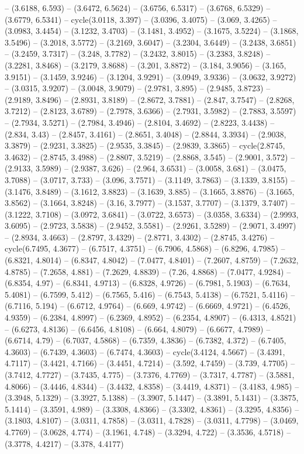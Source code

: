 -- (3.6188, 6.593) -- (3.6472, 6.5624) -- (3.6756, 6.5317) -- (3.6768, 6.5329) -- (3.6779, 6.5341) -- cycle(3.0118, 3.397) -- (3.0396, 3.4075) -- (3.069, 3.4265) -- (3.0983, 3.4454) -- (3.1232, 3.4703) -- (3.1481, 3.4952) -- (3.1675, 3.5224) -- (3.1868, 3.5496) -- (3.2018, 3.5772) -- (3.2169, 3.6047) -- (3.2304, 3.6449) -- (3.2438, 3.6851) -- (3.2459, 3.7317) -- (3.248, 3.7782) -- (3.2432, 3.8015) -- (3.2383, 3.8248) -- (3.2281, 3.8468) -- (3.2179, 3.8688) -- (3.201, 3.8872) -- (3.184, 3.9056) -- (3.165, 3.9151) -- (3.1459, 3.9246) -- (3.1204, 3.9291) -- (3.0949, 3.9336) -- (3.0632, 3.9272) -- (3.0315, 3.9207) -- (3.0048, 3.9079) -- (2.9781, 3.895) -- (2.9485, 3.8723) -- (2.9189, 3.8496) -- (2.8931, 3.8189) -- (2.8672, 3.7881) -- (2.847, 3.7547) -- (2.8268, 3.7212) -- (2.8123, 3.6789) -- (2.7978, 3.6366) -- (2.7931, 3.5982) -- (2.7883, 3.5597) -- (2.7934, 3.5271) -- (2.7984, 3.4946) -- (2.8104, 3.4692) -- (2.8223, 3.4438) -- (2.834, 3.43) -- (2.8457, 3.4161) -- (2.8651, 3.4048) -- (2.8844, 3.3934) -- (2.9038, 3.3879) -- (2.9231, 3.3825) -- (2.9535, 3.3845) -- (2.9839, 3.3865) -- cycle(2.8745, 3.4632) -- (2.8745, 3.4988) -- (2.8807, 3.5219) -- (2.8868, 3.545) -- (2.9001, 3.572) -- (2.9133, 3.5989) -- (2.9387, 3.626) -- (2.964, 3.6531) -- (3.0058, 3.681) -- (3.0475, 3.7088) -- (3.0717, 3.733) -- (3.096, 3.7571) -- (3.1149, 3.7863) -- (3.1339, 3.8155) -- (3.1476, 3.8489) -- (3.1612, 3.8823) -- (3.1639, 3.885) -- (3.1665, 3.8876) -- (3.1665, 3.8562) -- (3.1664, 3.8248) -- (3.16, 3.7977) -- (3.1537, 3.7707) -- (3.1379, 3.7407) -- (3.1222, 3.7108) -- (3.0972, 3.6841) -- (3.0722, 3.6573) -- (3.0358, 3.6334) -- (2.9993, 3.6095) -- (2.9723, 3.5838) -- (2.9452, 3.5581) -- (2.9261, 3.5289) -- (2.9071, 3.4997) -- (2.8934, 3.4663) -- (2.8797, 3.4329) -- (2.8771, 3.4302) -- (2.8745, 3.4276) -- cycle(6.7495, 4.3677) -- (6.7517, 4.3751) -- (6.7906, 4.5868) -- (6.8296, 4.7985) -- (6.8321, 4.8014) -- (6.8347, 4.8042) -- (7.0477, 4.8401) -- (7.2607, 4.8759) -- (7.2632, 4.8785) -- (7.2658, 4.881) -- (7.2629, 4.8839) -- (7.26, 4.8868) -- (7.0477, 4.9284) -- (6.8354, 4.97) -- (6.8341, 4.9713) -- (6.8328, 4.9726) -- (6.7981, 5.1903) -- (6.7634, 5.4081) -- (6.7599, 5.412) -- (6.7565, 5.416) -- (6.7543, 5.4138) -- (6.7521, 5.4116) -- (6.7116, 5.194) -- (6.6712, 4.9764) -- (6.669, 4.9742) -- (6.6669, 4.9721) -- (6.4526, 4.9359) -- (6.2384, 4.8997) -- (6.2369, 4.8952) -- (6.2354, 4.8907) -- (6.4313, 4.8521) -- (6.6273, 4.8136) -- (6.6456, 4.8108) -- (6.664, 4.8079) -- (6.6677, 4.7989) -- (6.6714, 4.79) -- (6.7037, 4.5868) -- (6.7359, 4.3836) -- (6.7382, 4.372) -- (6.7405, 4.3603) -- (6.7439, 4.3603) -- (6.7474, 4.3603) -- cycle(3.4124, 4.5667) -- (3.4391, 4.7117) -- (3.4421, 4.7166) -- (3.4451, 4.7214) -- (3.592, 4.7459) -- (3.739, 4.7705) -- (3.7412, 4.7727) -- (3.7435, 4.775) -- (3.7376, 4.7769) -- (3.7317, 4.7787) -- (3.5881, 4.8066) -- (3.4446, 4.8344) -- (3.4432, 4.8358) -- (3.4419, 4.8371) -- (3.4183, 4.985) -- (3.3948, 5.1329) -- (3.3927, 5.1388) -- (3.3907, 5.1447) -- (3.3891, 5.1431) -- (3.3875, 5.1414) -- (3.3591, 4.989) -- (3.3308, 4.8366) -- (3.3302, 4.8361) -- (3.3295, 4.8356) -- (3.1803, 4.8107) -- (3.0311, 4.7858) -- (3.0311, 4.7828) -- (3.0311, 4.7798) -- (3.0469, 4.7769) -- (3.0628, 4.774) -- (3.1961, 4.748) -- (3.3294, 4.722) -- (3.3536, 4.5718) -- (3.3778, 4.4217) -- (3.378, 4.4177) 